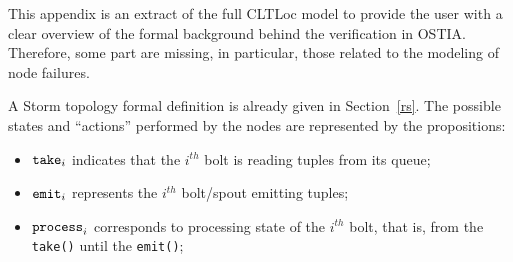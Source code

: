 \onecolumn
% 
%
%
%
%
%

This appendix is an extract of the full CLTLoc model to provide the user with a clear overview of the formal background behind the verification in OSTIA.
Therefore, some part are missing, in particular, those related to the modeling of node failures.

A Storm topology formal definition is already given in Section~\ref{rs}.
The possible states and ``actions'' performed by the nodes are represented by the propositions:
\begin{itemize}
\item $\mathtt{take}_{i}$ indicates that the $i^{th}$ bolt is reading tuples from its queue;
\item $\mathtt{emit}_{i}$ represents the $ i^{th} $ bolt/spout  emitting tuples;
\item $\mathtt{process}_{i}$ corresponds to processing state of the $i^{th}$ bolt, that is, from the \texttt{take()} until the \texttt{emit()}; 
\end{itemize}

